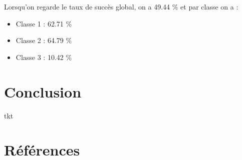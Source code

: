 \documentclass[a4paper,12pt]{article}
\begin{document}
Lorsqu'on regarde le taux de succès global, on a 49.44 \% et par classe on a : \\
\begin{itemize}
\item Classe 1 : 62.71 \%
\item Classe 2 : 64.79 \%
\item Classe 3 : 10.42 \%
\end{itemize}

\section{Conclusion}
\label{sec:conclusion}
tkt

\section*{Références}
\label{sec:référence}
\end{document}
